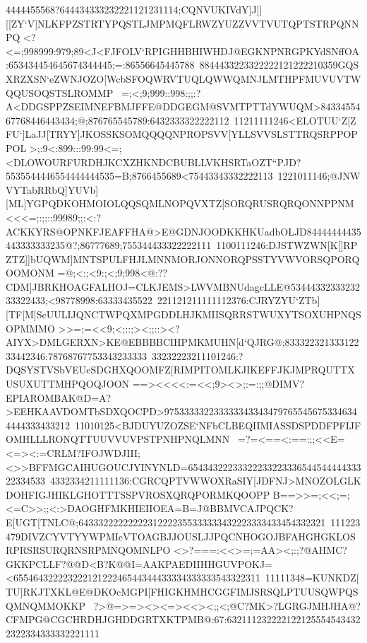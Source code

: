 {{{ 4444455568?644434333232221121231114;CQNVUKIVdY]J]][[ZY`V]NLKFPZSTRTYPQSTLJMPMQFLRWZYUZZVVTVUTQPTSTRPQNNPQ%
 }
 \hbox{<?<=;998999:979;89<J<FJFOLV`RPIGHHBHIWHDJ@EGKNPNRGPKYdSNffOA:653434454645674344445;=:86556645445788%
 8844433223322222121222210359GQSXRZXSN`eZWNJOZO[WcbSFOQWRVTUQLQWWQMNJLMTHPFMUVUVTWQQUSOQSTSLROMMP%
 }
 \hbox{=;<;9;999::998:;;:?A<DDGSPPZSEIMNEFBMJFFE@DDGEGM@SVMTPTTdYWUQM>8433455467768446443434;@;876765545789:6432333322222112%
 11211111246<ELOTUU`Z[ZFU`]LaJJ[TRYY]JKOSSKSOMQQQQNPROPSVV[YLLSVVSLSTTRQSRPPOPPOL}
 \hbox{>;:9<:899:::99:99<=;<DLOWOURFURDHJKCXZHKNDCBUBLLVKHSRTaOZT``PJD?5535544446554444444535=B;8766455689<75443343332222113%
 1221011146;@JNWVYTabRRbQ]YUVb][ML]YGPQDKOHMOIOLQQSQMLNOPQVXTZ[SORQRUSRQRQONNPPNM}
 \hbox{<<<=;:;;::99989;;:<:?ACKKYRS@OPNKFJEAFFHA@>E@GDNJOODKKHKUadbOLJD84444444435443333333235@?;86777689;755344433322222111%
 1100111246:DJSTWZWN[K[]RPZTZ]]bUQWM]MNTSPULFHJLMNNMORJONNORQPSSTYVWVORSQPORQOOMONM}
 \hbox{=@;<:;<9:;<;9;998<@:??CDM]JBRKHOAGFALHOJ=CLKJEMS>LWVMBNUdagcLLE@5344433233323233322433;<98778998:63333435522%
 221121211111112376:CJRYZYU`ZTb][TF[M]ScUULIJQNCTWPQXMPGDDLHJKMIISQRRSTWUXYTSOXUHPNQSOPMMMO}
 \hbox{>>=;=<<9;<;::;><;;::><?AIYX>DMLGERXN>KE@EBBBBCIHPMKMUHN[d`QJRG@;83332232133312233442346:78768767753343233333%
 33232223211101246:?DQSYSTVSbVEUeSDGHXQOOMFZ[RIMPITOMLKJIKEFFJKJMPRQUTTXUSUXUTTMHPQOQJOON}
 \hbox{==><<<<:=<<;9><>;:=:;;@DIMV?EPIAROMBAK@D=A?>EEHKAAVDOMTbSDXQOCPD>9753333322333333433434797655456753346344444333433212%
 11010125<BJDUYUZOZSE`NFbCLBEQIIMIASSDSPDDFPFIJFOMHLLLRONQTTUUVVUVPSTPNHPNQLMNN%
 }
 \hbox{=?=<==<:==:;;<<E=<=><:=CRLM?IFOJWDJIII;<>>BFFMGCAIHUGOUCJYINYNLD=6543432223332223322333654454444433322334533%
 4332334211111136:CGRCQPTVWWOXRaSIY[JDFNJ>MNOZOLGLKDOHFIGJHIKLGHOTTTSSPVROSXQRQPORMKQOOPP}
 \hbox{B==>>=;<<;=;<=C>>;;<:>DAOGHFMKHIEIIOEA=B=J@BBMVCAJPQCK?E[UGT[TNLC@;64333222222222312222355333333432223333433454332321%
 111223479DIVZCYVTYYWPMIcVTOAGBJJOUSLJJPQCNHOGOJBFAHGHGKLOSRPRSRSURQRNSRPMNQOMNLPO}
 \hbox{<>?===:<<>=;=AA><;:;?@AHMC?GKKPCLLF?@@D<B?K@@I=AAKPAEDIIHHGUVPOKJ=<65546432222322212122246544344433334333333543322311%
 11111348=KUNKDZ[TU]RKJTXKL@E@DKOcMGPI[FHIGKHMHCGGFIMJSRSQLPTUUSQWPQSQMNQMMOKKP%
 }
 \hbox{?>@=>=><><=><<><;;<;@C?MK>?LGRGJMHJHA@?CFMPG@CGCHRDHJGHDDGRTXKTPMB@:67:6321112322221221255545434322322334333332221111%
}}}
